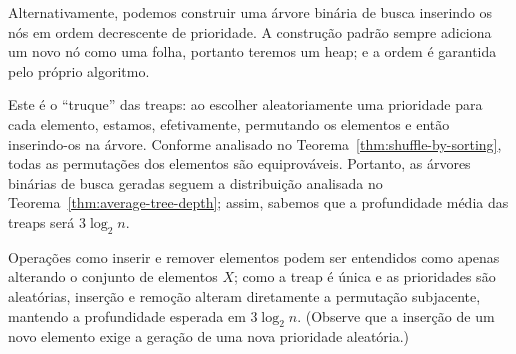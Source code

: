 Alternativamente,
podemos construir uma árvore binária de busca
inserindo os nós em ordem decrescente de prioridade.
A construção padrão sempre adiciona um novo nó como uma folha,
portanto teremos um heap;
e a ordem é garantida pelo próprio algoritmo.

Este é o ``truque'' das treaps:
ao escolher aleatoriamente uma prioridade para cada elemento,
estamos, efetivamente,
permutando os elementos e então inserindo-os na árvore.
Conforme analisado no Teorema~\ref{thm:shuffle-by-sorting},
todas as permutações dos elementos são equiprováveis.
Portanto,
as árvores binárias de busca geradas
seguem a distribuição analisada no Teorema~\ref{thm:average-tree-depth};
assim,
sabemos que a profundidade média das treaps será $3 \log_2 n$.

Operações como inserir e remover elementos
podem ser entendidos como apenas alterando o conjunto de elementos $X$;
como a treap é única e as prioridades são aleatórias,
inserção e remoção alteram diretamente a permutação subjacente,
mantendo a profundidade esperada em $3 \log_2 n$.
(Observe que a inserção de um novo elemento
exige a geração de uma nova prioridade aleatória.)
